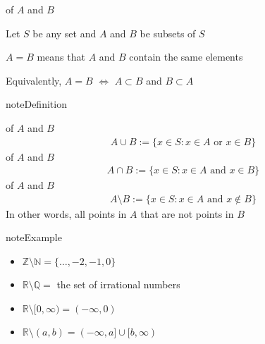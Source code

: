 \documentclass[letterpaper,10pt,english]{jupyterBook}
\begin{document}
\sphinxAtStartPar
{} of \(A\) and \(B\)

\sphinxAtStartPar
Let \(S\) be any set and \(A\) and \(B\) be subsets of \(S\)

\sphinxAtStartPar
\(A = B\) means that \(A\) and \(B\) contain the same elements

\sphinxAtStartPar
Equivalently, \(A = B\) \(\iff\) \(A \subset B\) and \(B \subset A\)

\begin{sphinxadmonition}{note}{Definition}

\sphinxAtStartPar
{} of \(A\) and \(B\)
\begin{equation*}
\begin{split}
A \cup B := 
\{ x \in S : x \in A \text{ or } x \in B \}
\end{split}
\end{equation*}
\sphinxAtStartPar
{} of \(A\) and \(B\)
\begin{equation*}
\begin{split}
A \cap B := 
\{ x \in S : x \in A \text{ and } x \in B \}
\end{split}
\end{equation*}
\sphinxAtStartPar
{} of \(A\) and \(B\)
\begin{equation*}
\begin{split}
A \setminus B := 
\{ x \in S : x \in A \text{ and } x \notin B \}
\end{split}
\end{equation*}
\sphinxAtStartPar
In other words, all points in \(A\) that are not points in \(B\)
\end{sphinxadmonition}

\begin{sphinxadmonition}{note}{Example}
\begin{itemize}
\item {} 
\sphinxAtStartPar
\(\mathbb{Z} \setminus \mathbb{N} = \{\ldots, -2, -1, 0\}\)

\item {} 
\sphinxAtStartPar
\(\mathbb{R} \setminus \mathbb{Q} = \) the set of irrational numbers

\item {} 
\sphinxAtStartPar
\(\mathbb{R} \setminus [0, \infty) = (-\infty, 0)\)

\item {} 
\sphinxAtStartPar
\(\mathbb{R} \setminus (a, b) = (-\infty, a] \cup [b, \infty)\)

\end{itemize}
\end{sphinxadmonition}
\end{document}
